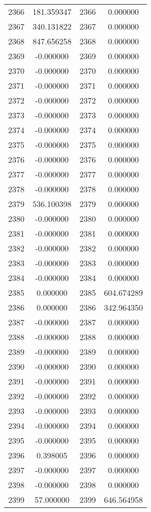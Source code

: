 \documentclass[12pt]{article}
\begin{document}
\begin{longtable}{@{}cccc@{}}
2366 & 181.359347 & 2366 & 0.000000 \\
2367 & 340.131822 & 2367 & 0.000000 \\
2368 & 847.656258 & 2368 & 0.000000 \\
2369 & -0.000000 & 2369 & 0.000000 \\
2370 & -0.000000 & 2370 & 0.000000 \\
2371 & -0.000000 & 2371 & 0.000000 \\
2372 & -0.000000 & 2372 & 0.000000 \\
2373 & -0.000000 & 2373 & 0.000000 \\
2374 & -0.000000 & 2374 & 0.000000 \\
2375 & -0.000000 & 2375 & 0.000000 \\
2376 & -0.000000 & 2376 & 0.000000 \\
2377 & -0.000000 & 2377 & 0.000000 \\
2378 & -0.000000 & 2378 & 0.000000 \\
2379 & 536.100398 & 2379 & 0.000000 \\
2380 & -0.000000 & 2380 & 0.000000 \\
2381 & -0.000000 & 2381 & 0.000000 \\
2382 & -0.000000 & 2382 & 0.000000 \\
2383 & -0.000000 & 2383 & 0.000000 \\
2384 & -0.000000 & 2384 & 0.000000 \\
2385 & 0.000000 & 2385 & 604.674289 \\
2386 & 0.000000 & 2386 & 342.964350 \\
2387 & -0.000000 & 2387 & 0.000000 \\
2388 & -0.000000 & 2388 & 0.000000 \\
2389 & -0.000000 & 2389 & 0.000000 \\
2390 & -0.000000 & 2390 & 0.000000 \\
2391 & -0.000000 & 2391 & 0.000000 \\
2392 & -0.000000 & 2392 & 0.000000 \\
2393 & -0.000000 & 2393 & 0.000000 \\
2394 & -0.000000 & 2394 & 0.000000 \\
2395 & -0.000000 & 2395 & 0.000000 \\
2396 & 0.398005 & 2396 & 0.000000 \\
2397 & -0.000000 & 2397 & 0.000000 \\
2398 & -0.000000 & 2398 & 0.000000 \\
2399 & 57.000000 & 2399 & 646.564958 \\

\end{longtable}
\end{document}
